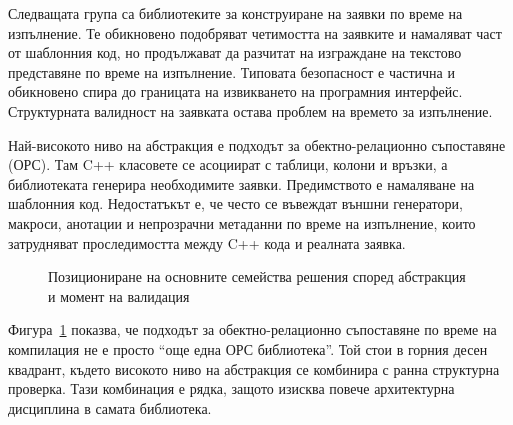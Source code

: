 Следващата група са библиотеките за конструиране на заявки по време на изпълнение. Те обикновено подобряват четимостта на заявките и намаляват част от шаблонния код, но продължават да разчитат на изграждане на текстово представяне по време на изпълнение. Типовата безопасност е частична и обикновено спира до границата на извикването на програмния интерфейс. Структурната валидност на заявката остава проблем на времето за изпълнение.

Най-високото ниво на абстракция е подходът за обектно-релационно съпоставяне (ОРС). Там C++ класовете се асоциират с таблици, колони и връзки, а библиотеката генерира необходимите заявки. Предимството е намаляване на шаблонния код. Недостатъкът е, че често се въвеждат външни генератори, макроси, анотации и непрозрачни метаданни по време на изпълнение, които затрудняват проследимостта между C++ кода и реалната заявка.

\begin{figure}[H]
\centering
{}
\caption{Позициониране на основните семейства решения според абстракция и момент на валидация}
\label{fig:existing_solutions_map}
\end{figure}

Фигура~\ref{fig:existing_solutions_map} показва, че подходът за обектно-релационно съпоставяне по време на компилация не е просто ``още една ОРС библиотека''. Той стои в горния десен квадрант, където високото ниво на абстракция се комбинира с ранна структурна проверка. Тази комбинация е рядка, защото изисква повече архитектурна дисциплина в самата библиотека.

